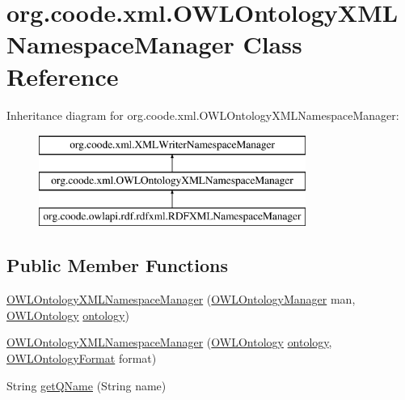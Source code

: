 \hypertarget{classorg_1_1coode_1_1xml_1_1_o_w_l_ontology_x_m_l_namespace_manager}{\section{org.\-coode.\-xml.\-O\-W\-L\-Ontology\-X\-M\-L\-Namespace\-Manager Class Reference}
\label{classorg_1_1coode_1_1xml_1_1_o_w_l_ontology_x_m_l_namespace_manager}
}
Inheritance diagram for org.\-coode.\-xml.\-O\-W\-L\-Ontology\-X\-M\-L\-Namespace\-Manager\-:\begin{figure}[H]
\begin{center}
\leavevmode
\includegraphics[height=3.000000cm]{classorg_1_1coode_1_1xml_1_1_o_w_l_ontology_x_m_l_namespace_manager}
\end{center}
\end{figure}
\subsection*{Public Member Functions}
\begin{DoxyCompactItemize}
\item 
\hyperlink{classorg_1_1coode_1_1xml_1_1_o_w_l_ontology_x_m_l_namespace_manager_a29d9c3873164fd190969b9095b09f289}{O\-W\-L\-Ontology\-X\-M\-L\-Namespace\-Manager} (\hyperlink{interfaceorg_1_1semanticweb_1_1owlapi_1_1model_1_1_o_w_l_ontology_manager}{O\-W\-L\-Ontology\-Manager} man, \hyperlink{interfaceorg_1_1semanticweb_1_1owlapi_1_1model_1_1_o_w_l_ontology}{O\-W\-L\-Ontology} \hyperlink{classorg_1_1coode_1_1xml_1_1_o_w_l_ontology_x_m_l_namespace_manager_aeb4906fd8488526e3e5dbff9393a0571}{ontology})
\item 
\hyperlink{classorg_1_1coode_1_1xml_1_1_o_w_l_ontology_x_m_l_namespace_manager_a90f05faf77db2c1e084e91a54f406f34}{O\-W\-L\-Ontology\-X\-M\-L\-Namespace\-Manager} (\hyperlink{interfaceorg_1_1semanticweb_1_1owlapi_1_1model_1_1_o_w_l_ontology}{O\-W\-L\-Ontology} \hyperlink{classorg_1_1coode_1_1xml_1_1_o_w_l_ontology_x_m_l_namespace_manager_aeb4906fd8488526e3e5dbff9393a0571}{ontology}, \hyperlink{classorg_1_1semanticweb_1_1owlapi_1_1model_1_1_o_w_l_ontology_format}{O\-W\-L\-Ontology\-Format} format)
\item 
String \hyperlink{classorg_1_1coode_1_1xml_1_1_o_w_l_ontology_x_m_l_namespace_manager_ac1c05f51d394c46a51172ed824b3d352}{get\-Q\-Name} (String name)
\end{DoxyCompactItemize}
